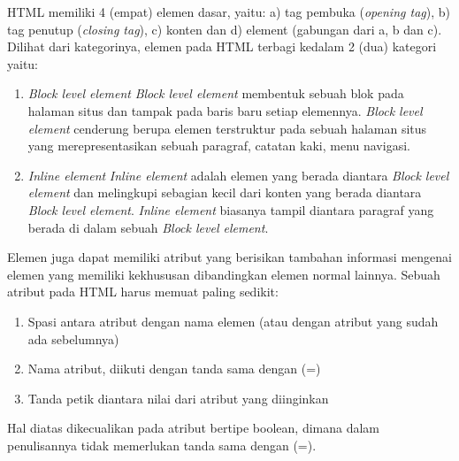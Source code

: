 \documentclass[pi.tex]{subfile}
\begin{document}
HTML memiliki 4 (empat) elemen dasar, yaitu: a) tag pembuka (\emph{opening tag}), b) tag penutup (\emph{closing tag}), c) konten dan d) element (gabungan dari a, b dan c). Dilihat dari kategorinya, elemen pada HTML terbagi kedalam 2 (dua) kategori yaitu:
\begin{enumerate}
\item \emph{Block level element}
  \emph{Block level element} membentuk sebuah blok pada halaman situs dan tampak pada baris baru setiap elemennya. \emph{Block level element} cenderung berupa elemen terstruktur pada sebuah halaman situs yang merepresentasikan sebuah paragraf, catatan kaki, menu navigasi.
\item \emph{Inline element}
  \emph{Inline element} adalah elemen yang berada diantara \emph{Block level element} dan melingkupi sebagian kecil dari konten yang berada diantara \emph{Block level element}. \emph{Inline element} biasanya tampil diantara paragraf yang berada di dalam sebuah \emph{Block level element}.
\end{enumerate}

Elemen juga dapat memiliki atribut yang berisikan tambahan informasi mengenai elemen yang memiliki kekhususan dibandingkan elemen normal lainnya. Sebuah atribut pada HTML harus memuat paling sedikit:
\begin{enumerate}
\item Spasi antara atribut dengan nama elemen (atau dengan atribut yang sudah ada sebelumnya)
\item Nama atribut, diikuti dengan tanda sama dengan (=)
\item Tanda petik diantara nilai dari atribut yang diinginkan
\end{enumerate}
Hal diatas dikecualikan pada atribut bertipe boolean, dimana dalam penulisannya tidak memerlukan tanda sama dengan (=).
\end{document}

